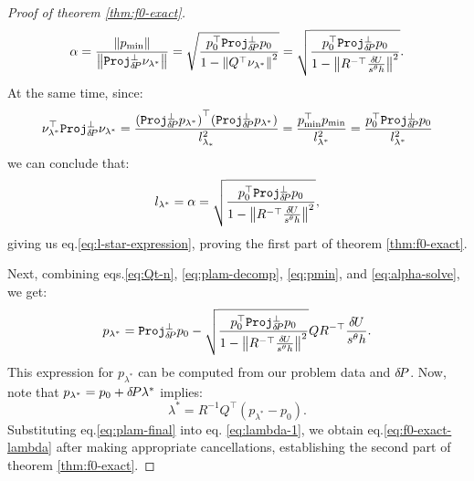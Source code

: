 \documentclass[smallcondensed]{svjour3}
\begin{document}
\begin{proof}[Proof of theorem \ref{thm:f0-exact}]
\begin{equation}
    \alpha = \frac{\left\|p_{\operatorname{min}}\right\|}{\left\|\mathtt{Proj}^\perp_{{\delta \hspace{-0.14em} P}} \nu_{\lambda^*}\right\|} = \sqrt{\frac{p_0^\top \mathtt{Proj}^\perp_{{\delta \hspace{-0.14em} P}} p_0}{1 - \left\|Q^\top \nu_{\lambda^*}\right\|^2}} = \sqrt{\frac{p_0^\top \mathtt{Proj}^\perp_{{\delta \hspace{-0.14em} P}} p_0}{1 - \left\|R^{-\top} \frac{{\delta \hspace{-0.09em} U}}{s^\theta h}\right\|^2}}.
  \end{equation}
  At the same time, since:
  \begin{equation}
    \nu_{\lambda^*}^\top \mathtt{Proj}^\perp_{{\delta \hspace{-0.14em} P}} \nu_{\lambda^*} = \frac{{(\mathtt{Proj}^\perp_{{\delta \hspace{-0.14em} P}} p_{\lambda^*})}^\top {(\mathtt{Proj}^\perp_{{\delta \hspace{-0.14em} P}} p_{\lambda^*})}}{l_{\lambda_*}^2} = \frac{p_{\operatorname{min}}^\top p_{\operatorname{min}}}{l_{\lambda^*}^2} = \frac{p_0^\top \mathtt{Proj}^\perp_{{\delta \hspace{-0.14em} P}} p_0}{l_{\lambda^*}^2}
  \end{equation}
  we can conclude that:
  \begin{equation}
    l_{\lambda^*} = \alpha = \sqrt{\frac{p_0^\top \mathtt{Proj}^\perp_{{\delta \hspace{-0.14em} P}} p_0}{1 - \left\|R^{-\top} \frac{{\delta \hspace{-0.09em} U}}{s^\theta h}\right\|^2}},
  \end{equation}
  giving us eq.\@ \ref{eq:l-star-expression}, proving the first
  part of theorem \ref{thm:f0-exact}.

  Next, combining eqs.\@ \ref{eq:Qt-n}, \ref{eq:plam-decomp},
  \ref{eq:pmin}, and \ref{eq:alpha-solve}, we get:
  \begin{equation}\label{eq:plam-final}
    p_{\lambda^*} = \mathtt{Proj}^\perp_{{\delta \hspace{-0.14em} P}} p_0 - \sqrt{\frac{p_0^\top \mathtt{Proj}^\perp_{{\delta \hspace{-0.14em} P}} p_0}{1 - \left\|R^{-\top} \frac{{\delta \hspace{-0.09em} U}}{s^\theta h}\right\|^2}} Q R^{-\top} \frac{{\delta \hspace{-0.09em} U}}{s^\theta h}.
  \end{equation}
  This expression for $p_{\lambda^*}$ can be computed from our problem
  data and ${\delta \hspace{-0.14em} P}$. Now, note that
  $p_{\lambda^*} = p_0 + {\delta \hspace{-0.14em} P} \lambda^*$ implies:
  \begin{equation}\label{eq:lambda-1}
    \lambda^* = R^{-1} Q^\top (p_{\lambda^*} - p_0).
  \end{equation}
  Substituting eq.\@ \ref{eq:plam-final} into eq.\@
  \ref{eq:lambda-1}, we obtain eq.\@ \ref{eq:f0-exact-lambda} after
  making appropriate cancellations, establishing the second part of
  theorem \ref{thm:f0-exact}.


\end{proof}
\end{document}
